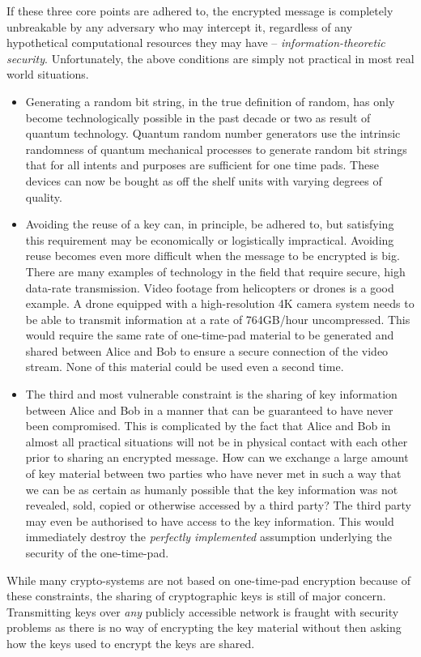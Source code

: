 \documentclass[twocolumn, aps, rmp, amsmath, amssymb, nofootinbib, superscriptaddress, longbibliography, floatfix, table-of-contents, eqsecnum]{revtex4-2}
\begin{document}
If these three core points are adhered to, the encrypted message is completely unbreakable by any adversary who may intercept it, regardless of any hypothetical computational resources they may have -- \textit{information-theoretic security}. Unfortunately, the above conditions are simply not practical in most real world situations. 
\begin{itemize}
\item Generating a random bit string, in the true definition of random, has only become technologically possible in the past decade or two as result of quantum technology. Quantum random number generators use the intrinsic randomness of quantum mechanical processes to generate random bit strings that for all intents and purposes are sufficient for one time pads. These devices can now be bought as off the shelf units with varying degrees of quality. 
\item Avoiding the reuse of a key can, in principle, be adhered to, but satisfying this requirement may be economically or logistically impractical. Avoiding reuse becomes even more difficult when the message to be encrypted is big. There are many examples of technology in the field that require secure, high data-rate transmission. Video footage from helicopters or drones is a good example. A drone equipped with a high-resolution 4K camera system needs to be able to transmit information at a rate of 764GB/hour uncompressed. This would require the same rate of one-time-pad material to be generated and shared between Alice and Bob to ensure a secure connection of the video stream. None of this material could be used even a second time. 
\item The third and most vulnerable constraint is the sharing of key information between Alice and Bob in a manner that can be guaranteed to have never been compromised. This is complicated by the fact that Alice and Bob in almost all practical situations will not be in physical contact with each other prior to sharing an encrypted message. How can we exchange a large amount of key material between two parties who have never met in such a way that we can be as certain as humanly possible that the key information was not revealed, sold, copied or otherwise accessed by a third party? The third party may even be authorised to have access to the key information. This would immediately destroy the \textit{perfectly implemented} assumption underlying the security of the one-time-pad. 
\end{itemize}

While many crypto-systems are not based on one-time-pad encryption because of these constraints, the sharing of cryptographic keys is still of major concern. Transmitting keys over \textit{any} publicly accessible network is fraught with security problems as there is no way of encrypting the key material without then asking how the keys used to encrypt the keys are shared.
\end{document}
